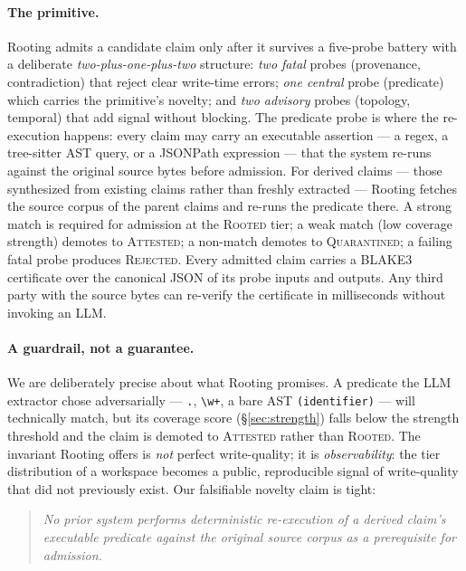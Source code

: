 \documentclass[10pt,a4paper]{article}
\begin{document}
\paragraph{The primitive.} Rooting admits a candidate claim only after it
survives a five-probe battery with a deliberate \emph{two-plus-one-plus-two}
structure: \emph{two fatal} probes (provenance, contradiction) that reject
clear write-time errors; \emph{one central} probe (predicate) which carries
the primitive's novelty; and \emph{two advisory} probes (topology, temporal)
that add signal without blocking. The predicate probe is where the
re-execution happens: every claim may carry an executable assertion ---
a regex, a tree-sitter AST query, or a JSONPath expression --- that the
system re-runs against the original source bytes before admission. For
derived claims --- those synthesized from existing claims rather than
freshly extracted --- Rooting fetches the source corpus of the parent
claims and re-runs the predicate there. A strong match is required for
admission at the \textsc{Rooted} tier; a weak match (low coverage
strength) demotes to \textsc{Attested}; a non-match demotes to
\textsc{Quarantined}; a failing fatal probe produces \textsc{Rejected}.
Every admitted claim carries a BLAKE3 certificate over the canonical JSON
of its probe inputs and outputs. Any third party with the source bytes can
re-verify the certificate in milliseconds without invoking an LLM.

\paragraph{A guardrail, not a guarantee.} We are deliberately precise
about what Rooting promises. A predicate the LLM extractor chose
adversarially --- \texttt{.}, \texttt{\textbackslash w+}, a bare AST
\texttt{(identifier)} --- will technically match, but its coverage score
(§\ref{sec:strength}) falls below the strength threshold and the claim is
demoted to \textsc{Attested} rather than \textsc{Rooted}. The invariant
Rooting offers is \emph{not} perfect write-quality; it is
\emph{observability}: the tier distribution of a workspace becomes a
public, reproducible signal of write-quality that did not previously
exist. Our falsifiable novelty claim is tight:

\begin{quote}\small\itshape
  No prior system performs deterministic re-execution of a derived
  claim's executable predicate against the original source corpus as a
  prerequisite for admission.
\end{quote}
\end{document}
